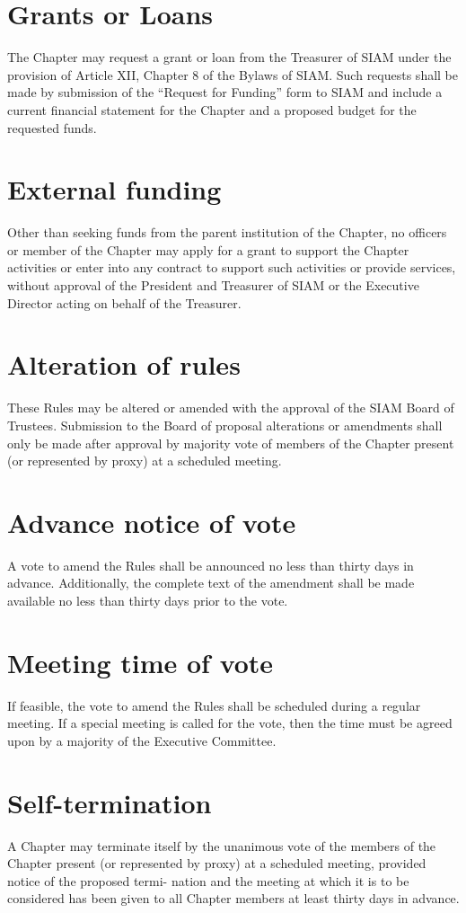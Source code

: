 \documentclass{ronr-bylaws}
\begin{document}
\section{Grants or Loans}
The Chapter may request a grant or loan from the Treasurer of SIAM under the provision of Article XII, Chapter 8 of the Bylaws of SIAM. Such requests shall be made by submission of
the ``Request for Funding'' form to SIAM and include a current financial statement for the Chapter
and a proposed budget for the requested funds.

\section{External funding}
Other than seeking funds from the parent institution of the Chapter, no officers
or member of the Chapter may apply for a grant to support the Chapter activities or enter into
any contract to support such activities or provide services, without approval of the President and
Treasurer of SIAM or the Executive Director acting on behalf of the Treasurer.

\section{Alteration of rules}
These Rules may be altered or amended with the approval of the SIAM Board of Trustees. Submission to the Board of proposal alterations or amendments shall only be made after approval by majority vote of members of the Chapter present (or represented by proxy) at a scheduled meeting.

\section{Advance notice of vote}
A vote to amend the Rules shall be announced no less than thirty days in advance. Additionally,
the complete text of the amendment shall be made available no less than thirty days prior to the
vote.

\section{Meeting time of vote}
If feasible, the vote to amend the Rules shall be scheduled during a regular meeting. If a special
meeting is called for the vote, then the time must be agreed upon by a majority of the Executive
Committee.

\section{Self-termination}
A Chapter may terminate itself by the unanimous vote of the members of the Chapter
present (or represented by proxy) at a scheduled meeting, provided notice of the proposed termi-
nation and the meeting at which it is to be considered has been given to all Chapter members at
least thirty days in advance.
\end{document}
